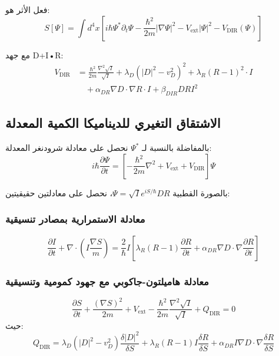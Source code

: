 \documentclass[11pt,a4paper]{article}
\begin{document}
	فعل الأثر هو:
	\begin{equation}
		S[\Psi] = \int d^4x \left[ i\hbar \Psi^* \partial_t \Psi - \frac{\hbar^2}{2m} |\nabla \Psi|^2 - V_{\text{ext}} |\Psi|^2 - V_{\text{DIR}}(\Psi) \right]
	\end{equation}
	
	مع جهد D+I•R:
	\begin{align}
		V_{\text{DIR}} &= \frac{\hbar^2}{2m} \frac{\nabla^2 \sqrt{I}}{\sqrt{I}} 
		+ \lambda_D (|D|^2 - v_D^2)^2 
		+ \lambda_R (R - 1)^2 \cdot I \\
		&\quad + \alpha_{DR} \nabla D \cdot \nabla R \cdot I 
		+ \beta_{DIR} D R I^2
	\end{align}
	
	\subsection{الاشتقاق التغيري للديناميكا الكمية المعدلة}
	
	بالمفاضلة بالنسبة لـ $\Psi^*$ نحصل على معادلة شرودنغر المعدلة:
	\begin{equation}
		i\hbar \frac{\partial \Psi}{\partial t} = \left[ -\frac{\hbar^2}{2m} \nabla^2 + V_{\text{ext}} + V_{\text{DIR}} \right] \Psi
	\end{equation}
	
	بالصورة القطبية $\Psi = \sqrt{I} e^{iS/\hbar} D R$، نحصل على معادلتين حقيقيتين:
	
	\subsubsection{معادلة الاستمرارية بمصادر تنسيقية}
	\begin{equation}
		\frac{\partial I}{\partial t} + \nabla \cdot \left( I \frac{\nabla S}{m} \right) = \frac{2}{\hbar} I \left[ \lambda_R (R-1) \frac{\partial R}{\partial t} + \alpha_{DR} \nabla D \cdot \nabla \frac{\partial R}{\partial t} \right]
	\end{equation}
	
	\subsubsection{معادلة هاميلتون-جاكوبي مع جهود كمومية وتنسيقية}
	\begin{equation}
		\frac{\partial S}{\partial t} + \frac{(\nabla S)^2}{2m} + V_{\text{ext}} - \frac{\hbar^2}{2m} \frac{\nabla^2 \sqrt{I}}{\sqrt{I}} + Q_{\text{DIR}} = 0
	\end{equation}
	حيث:
	\begin{equation}
		Q_{\text{DIR}} = \lambda_D (|D|^2 - v_D^2) \frac{\delta |D|^2}{\delta S} 
		+ \lambda_R (R-1) I \frac{\delta R}{\delta S}
		+ \alpha_{DR} I \nabla D \cdot \nabla \frac{\delta R}{\delta S}
	\end{equation}
	
\end{document}
